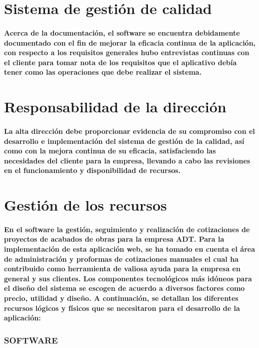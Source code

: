 \documentclass[12pt,a4paper]{article}
\begin{document}
\section{Sistema de gestión de calidad}
\paragraph{Acerca de la documentación, el software se encuentra debidamente documentado con el fin de mejorar la eficacia continua de la aplicación, con respecto a los requisitos generales hubo entrevistas continuas con el cliente para tomar nota de los requisitos que el aplicativo debía tener como las operaciones que debe realizar el sistema.}
\section{ Responsabilidad de la dirección}
\paragraph{La alta dirección debe proporcionar evidencia de su compromiso con el desarrollo e implementación del sistema de gestión de la calidad, así como con la mejora continua de su eficacia, satisfaciendo las necesidades del cliente para la empresa, llevando a cabo las revisiones en el funcionamiento y disponibilidad de recursos.}
\newpage
\section{Gestión de los recursos}
\paragraph{En el software la gestión, seguimiento y realización de cotizaciones de proyectos de acabados de obras para la empresa ADT. Para la implementación de esta aplicación web, se ha tomado en cuenta el área de administración y proformas de cotizaciones manuales el cual ha contribuido como herramienta de valiosa ayuda para la empresa en general y sus clientes.
Los componentes tecnológicos más idóneos para el diseño del sistema se escogen de acuerdo a diversos factores como precio, utilidad y diseño. A continuación, se detallan los diferentes recursos lógicos y físicos que se necesitaron para el desarrollo de la aplicación:}
\subsubsection{SOFTWARE }
\end{document}

